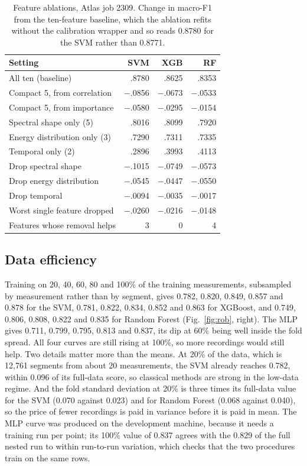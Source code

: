 \documentclass[conference]{IEEEtran}
\begin{document}
\begin{table}[t]
\centering
\caption{Feature ablations, Atlas job 2309. Change in macro-F1 from the ten-feature baseline, which the ablation refits without the calibration wrapper and so reads 0.8780 for the SVM rather than 0.8771.}
\label{tab:abl}
\footnotesize
\setlength{\tabcolsep}{3pt}
\begin{tabular}{@{}lrrr@{}}
\toprule
Setting & SVM & XGB & RF \\
\midrule
All ten (baseline) & .8780 & .8625 & .8353 \\
\midrule
Compact 5, from correlation & $-$.0856 & $-$.0673 & $-$.0533 \\
Compact 5, from importance & $-$.0580 & $-$.0295 & $-$.0154 \\
\midrule
Spectral shape only (5) & .8016 & .8099 & .7920 \\
Energy distribution only (3) & .7290 & .7311 & .7335 \\
Temporal only (2) & .2896 & .3993 & .4113 \\
\midrule
Drop spectral shape & $-$.1015 & $-$.0749 & $-$.0573 \\
Drop energy distribution & $-$.0545 & $-$.0447 & $-$.0550 \\
Drop temporal & $-$.0094 & $-$.0035 & $-$.0017 \\
\midrule
Worst single feature dropped & $-$.0260 & $-$.0216 & $-$.0148 \\
Features whose removal helps & 3 & 0 & 4 \\
\bottomrule
\end{tabular}
\end{table}

\subsection{Data efficiency}
Training on 20, 40, 60, 80 and 100\% of the training measurements, subsampled by measurement rather than by segment, gives 0.782, 0.820, 0.849, 0.857 and 0.878 for the SVM, 0.781, 0.822, 0.834, 0.852 and 0.863 for XGBoost, and 0.749, 0.806, 0.808, 0.822 and 0.835 for Random Forest (Fig.~\ref{fig:rob}, right). The MLP gives 0.711, 0.799, 0.795, 0.813 and 0.837, its dip at 60\% being well inside the fold spread. All four curves are still rising at 100\%, so more recordings would still help. Two details matter more than the means. At 20\% of the data, which is 12,761 segments from about 20 measurements, the SVM already reaches 0.782, within 0.096 of its full-data score, so classical methods are strong in the low-data regime. And the fold standard deviation at 20\% is three times its full-data value for the SVM (0.070 against 0.023) and for Random Forest (0.068 against 0.040), so the price of fewer recordings is paid in variance before it is paid in mean. The MLP curve was produced on the development machine, because it needs a training run per point; its 100\% value of 0.837 agrees with the 0.829 of the full nested run to within run-to-run variation, which checks that the two procedures train on the same rows.
\end{document}
